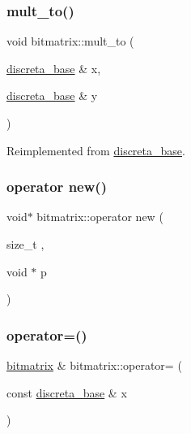 \mbox{\label{classbitmatrix_af7dba8c0de2128e6aa413b70bcc1f78f}} 
\subsubsection{\texorpdfstring{mult\+\_\+to()}{mult\_to()}}
{\footnotesize\ttfamily void bitmatrix\+::mult\+\_\+to (\begin{DoxyParamCaption}\item[{\mbox{\hyperlink{classdiscreta__base}{discreta\+\_\+base}} \&}]{x,  }\item[{\mbox{\hyperlink{classdiscreta__base}{discreta\+\_\+base}} \&}]{y }\end{DoxyParamCaption})\hspace{0.3cm}{\ttfamily [virtual]}}



Reimplemented from \mbox{\hyperlink{classdiscreta__base_a54d5c16c016769e3365639721c06591e}{discreta\+\_\+base}}.

\mbox{\label{classbitmatrix_a91f184b6e870e211db7535e9baaf710e}} 
\subsubsection{\texorpdfstring{operator new()}{operator new()}}
{\footnotesize\ttfamily void$\ast$ bitmatrix\+::operator new (\begin{DoxyParamCaption}\item[{size\+\_\+t}]{,  }\item[{void $\ast$}]{p }\end{DoxyParamCaption})\hspace{0.3cm}{\ttfamily [inline]}}

\mbox{\label{classbitmatrix_ac7386ca418929a7d0a0fdf38b0cb99e4}} 
\subsubsection{\texorpdfstring{operator=()}{operator=()}}
{\footnotesize\ttfamily \mbox{\hyperlink{classbitmatrix}{bitmatrix}} \& bitmatrix\+::operator= (\begin{DoxyParamCaption}\item[{const \mbox{\hyperlink{classdiscreta__base}{discreta\+\_\+base}} \&}]{x }\end{DoxyParamCaption})}

